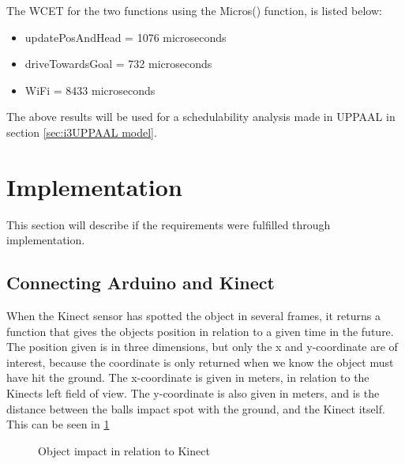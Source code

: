 The WCET for the two functions using the Micros() function, is listed below:
\begin{itemize}
	\item updatePosAndHead = 1076 microseconds
	\item driveTowardsGoal = 732 microseconds
	\item WiFi = 8433 microseconds
\end{itemize}

The above results will be used for a schedulability analysis made in UPPAAL in section \ref{sec:i3UPPAAL model}. 
\section{Implementation}
\label{sec:i3Implementation}
This section will describe if the requirements were fulfilled through implementation.

\subsection{Connecting Arduino and Kinect}
\label{sec:i3Connecting Arduino and Kinect implementation}

When the Kinect sensor has spotted the object in several frames, it returns a function that gives the objects position in relation to a given time in the future.
The position given is in three dimensions, but only the x and y-coordinate are of interest, because the coordinate is only returned when we know the object must have hit the ground. The x-coordinate is given in meters, in relation to the Kinects left field of view. The y-coordinate is also given in meters, and is the distance between the balls impact spot with the ground, and the Kinect itself. This can be seen in \ref{FieldOfView}

\begin{figure}[h]
	\centering
	\caption{Object impact in relation to Kinect}
	\label{FieldOfView}
\end{figure}

